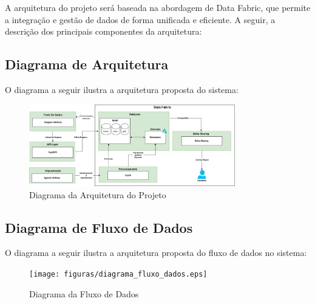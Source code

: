 A arquitetura do projeto será baseada na abordagem de Data Fabric, que permite a integração e gestão de dados de forma unificada e eficiente. A seguir, a descrição dos principais componentes da arquitetura:

\subsection{Diagrama de Arquitetura}
O diagrama a seguir ilustra a arquitetura proposta do sistema:
\begin{figure}[h]
    \centering
    \includegraphics[width=0.8\textwidth]{figuras/arquitetura.eps}
    \caption{Diagrama da Arquitetura do Projeto }
    \label{fig:arquitetura_projeto}
\end{figure} 

\subsection{Diagrama de Fluxo de Dados}
O diagrama a seguir ilustra a arquitetura proposta do fluxo de dados no sistema:
\begin{figure}[h]
    \centering
    \texttt{[image: figuras/diagrama\_fluxo\_dados.eps]}
    \caption{Diagrama da Fluxo de Dados }
    \label{fig:arquitetura_projeto}
\end{figure} 



